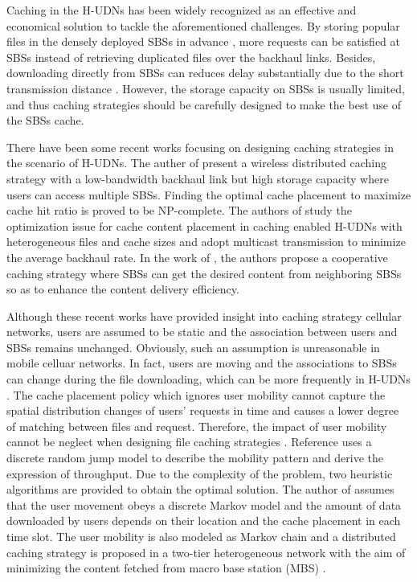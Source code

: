 \documentclass[conference]{IEEEtran}
\begin{document}
Caching in the H-UDNs has been widely recognized as an effective and economical solution to tackle the aforementioned challenges. By storing popular files in the densely deployed SBSs in advance \cite{8269405}, more requests can be satisfied at SBSs instead of retrieving duplicated files over the backhaul links. Besides, downloading directly from SBSs can reduces delay substantially due to the short transmission distance \cite{6736753}. However, the storage capacity on SBSs is usually limited, and thus caching strategies should be carefully designed to make the best use of the SBSs cache.

There have been some recent works focusing on designing caching strategies in the scenario of H-UDNs. The auther of \cite{6600983} present a wireless distributed caching strategy with a low-bandwidth backhaul link but high storage capacity where users can access multiple SBSs. Finding the optimal cache placement to maximize cache hit ratio is proved to be NP-complete. The authors of \cite{6952688} study the optimization issue for cache content placement in caching enabled H-UDNs with heterogeneous files and cache sizes and adopt multicast transmission to minimize the average backhaul rate. In the work of \cite{8116421}, the authors propose a cooperative caching strategy where SBSs can get the desired content from neighboring SBSs so as to enhance the content delivery efficiency.

Although these recent works have provided insight into caching strategy cellular networks, users are assumed to be static and the association between users and SBSs remains unchanged. Obviously, such an assumption is unreasonable in mobile celluar networks. In fact, users are moving and the associations to SBSs can change during the file downloading, which can be more frequently in H-UDNs \cite{7268835}. The cache placement policy which ignores user mobility cannot capture the spatial distribution changes of users' requests in time and causes a lower degree of matching between files and request. Therefore, the impact of user mobility cannot be neglect when designing file caching strategies \cite{7537180}. Reference \cite{8013789} uses a discrete random jump model to describe the mobility pattern and derive the expression of throughput. Due to the complexity of the problem, two heuristic algorithms are provided to obtain the optimal solution. The author of \cite{6620380} assumes that the user movement obeys a discrete Markov model and the amount of data downloaded by users depends on their location and the cache placement in each time slot. The user mobility is also modeled as Markov chain and a distributed caching strategy is proposed in a two-tier heterogeneous network with the aim of minimizing the content fetched from macro base station (MBS) \cite{7484297}.
\end{document}
